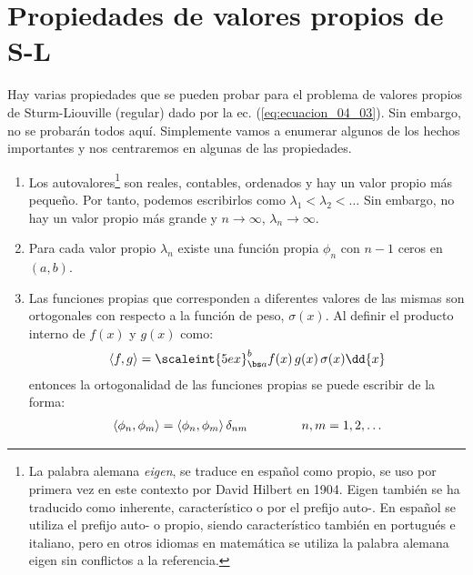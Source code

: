 \section{Propiedades de valores propios de S-L}

Hay varias propiedades que se pueden probar para el problema de valores propios de Sturm-Liouville (regular) dado por la ec. (\ref{eq:ecuacion_04_03}). Sin embargo, no se probarán todos aquí. Simplemente vamos a enumerar algunos de los hechos importantes y nos centraremos en algunas de las propiedades.
\begin{enumerate}
\item Los autovalores\footnote{La palabra alemana \emph{eigen}, se traduce en español como propio, se uso por primera vez en este contexto por David Hilbert en 1904. Eigen también se ha traducido como inherente, característico o por el prefijo auto-. En español se utiliza el prefijo auto- o propio, siendo característico también en portugués e italiano, pero en otros idiomas en matemática se utiliza la palabra alemana eigen sin conflictos a la referencia.} son reales, contables, ordenados y hay un valor propio más pequeño. Por tanto, podemos escribirlos como $\lambda_{1} < \lambda_{2} < \ldots $ Sin embargo, no hay un valor propio más grande y $n \to \infty$, $\lambda_{n} \to \infty$.
\item Para cada valor propio $\lambda_{n}$ existe una función propia $\phi_{n}$ con $n - 1$ ceros en $(a, b)$.
\item Las funciones propias que corresponden a diferentes valores de las mismas son ortogonales con respecto a la función de peso, $\sigma (x)$. Al definir el producto interno de $f (x)$ y $g (x)$ como:
\begin{align}
\langle f , g \rangle = \scaleint{5ex}_{\bs a}^{b} f(x) \, g(x) \, \sigma(x) \dd{x}
\label{eq:ecuacion_04_11}
\end{align}
entonces la ortogonalidad de las funciones propias se puede escribir de la forma:
\begin{align}
\langle \phi_{n}, \phi_{m} \rangle = \langle \phi_{n}, \phi_{m} \rangle \, \delta_{nm} \hspace{1.5cm} n, m = 1, 2, \ldots
\label{eq:ecuacion_04_12}
\end{align}


\end{enumerate}
